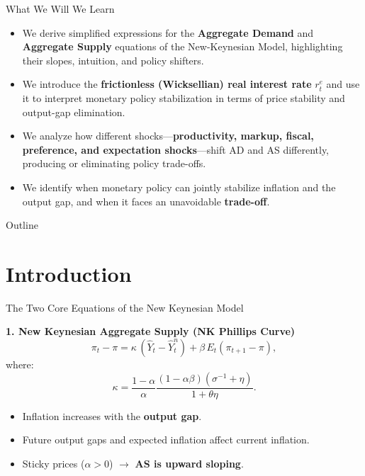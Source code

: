 \documentclass[11pt,aspectratio=169]{beamer}
\begin{document}
\begin{frame}{What We Will We Learn}
\small

\begin{itemize}


\item We derive simplified expressions for the \textbf{Aggregate Demand} and \textbf{Aggregate Supply} equations of the New-Keynesian Model, highlighting their slopes, intuition, and policy shifters.

\vspace{0.25cm}

\item We introduce the \textbf{frictionless (Wicksellian) real interest rate} $r_t^{e}$ and use it to interpret monetary policy stabilization in terms of price stability and output-gap elimination.

\vspace{0.25cm}

\item We analyze how different shocks—\textbf{productivity, markup, fiscal, preference, and expectation shocks}—shift AD and AS differently, producing or eliminating policy trade-offs.

\vspace{0.25cm}

\item We identify when monetary policy can jointly stabilize inflation and the output gap, and when it faces an unavoidable \textbf{trade-off}.

\end{itemize}

\end{frame}


\begin{frame}{Outline}
\tableofcontents
\end{frame}




\section{Introduction}

\begin{frame}{The Two Core Equations of the New Keynesian Model}
\small

\textbf{1. New Keynesian Aggregate Supply (NK Phillips Curve)}
\[
\pi_t - \pi
=
\kappa\,(\hat{Y}_t - \hat{Y}_t^n)
+
\beta\, E_t(\pi_{t+1}-\pi),
\]
where:
\[
\kappa = 
\frac{1-\alpha}{\alpha}
\frac{(1-\alpha\beta)(\sigma^{-1}+\eta)}{1+\theta\eta}.
\]

\begin{itemize}
    \item Inflation increases with the \textbf{output gap}.
    \item Future output gaps and expected inflation affect current inflation.
    \item Sticky prices ($\alpha>0$) $\rightarrow$ \textbf{AS is upward sloping}.
\end{itemize}

\end{frame}
\end{document}
